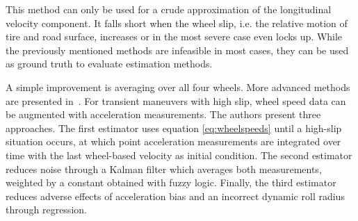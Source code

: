This method can only be used for a crude approximation of the longitudinal velocity component. It falls short when the wheel slip, i.e. the relative motion of tire and road surface, increases or in the most severe case even locks up. While the previously mentioned methods are infeasible in most cases, they can be used as ground truth to evaluate estimation methods.

A simple improvement is averaging over all four wheels. More advanced methods are presented in~\cite{Song.2002}. For transient maneuvers with high slip, wheel speed data can be augmented with acceleration measurements. The authors present three approaches. The first estimator uses equation \ref{eq:wheelspeeds} until a high-slip situation occurs, at which point acceleration measurements are integrated over time with the last wheel-based velocity as initial condition. The second estimator reduces noise through a Kalman filter which averages both measurements, weighted by a constant obtained with fuzzy logic. Finally, the third estimator reduces adverse effects of acceleration bias and an incorrect dynamic roll radius through regression.
